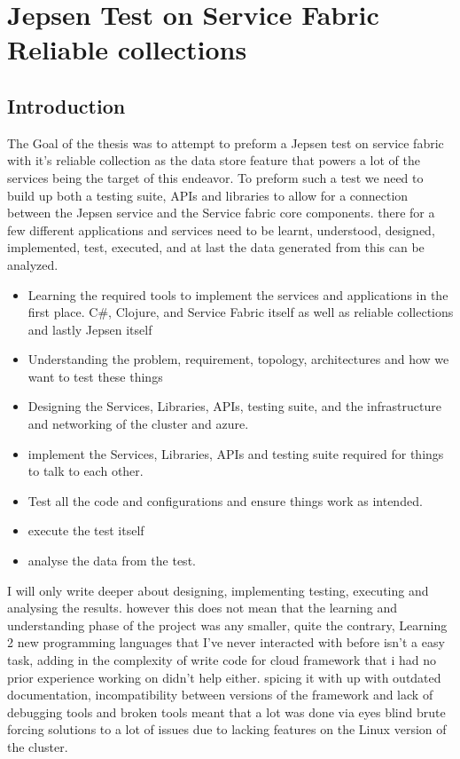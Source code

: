 \documentclass[a4paper,10pt,titlepage]{report}
\begin{document}
\chapter{Jepsen Test on Service Fabric Reliable collections}

\section{Introduction}

The Goal of the thesis was to attempt to preform a Jepsen test on service fabric with it's reliable collection as the data store feature that powers a lot of the services being the target of this endeavor. To preform such a test we need to build up both a testing suite, APIs and libraries to allow for a connection between the Jepsen service and the Service fabric core components. there for a few different applications and services need to be learnt, understood, designed, implemented, test, executed, and at last the data generated from this can be analyzed.
\begin{itemize}
    \item Learning the required tools to implement the services and applications in the first place. C\#, Clojure, and Service Fabric itself as well as reliable collections and lastly Jepsen itself
    \item Understanding the problem, requirement, topology, architectures and how we want to test these things
    \item Designing the Services, Libraries, APIs, testing suite, and the infrastructure and networking of the cluster and azure.
    \item implement the  Services, Libraries, APIs and testing suite required for things to talk to each other.
    \item Test all the code and configurations and ensure things work as intended.
    \item execute the test itself
    \item analyse the data from the test.
\end{itemize}

I will only write deeper about designing, implementing testing, executing and analysing the results. however this does not mean that the learning and understanding phase of the project was any smaller, quite the contrary, Learning 2 new programming languages that I've never interacted with before isn't a easy task, adding in the complexity of write code for cloud framework that i had no prior experience working on didn't help either. spicing it with up with outdated documentation, incompatibility between versions of the framework and lack of debugging tools and broken tools meant that a lot was done via eyes blind brute forcing solutions to a lot of issues due to lacking features on the Linux version of the cluster.\\
\end{document}
